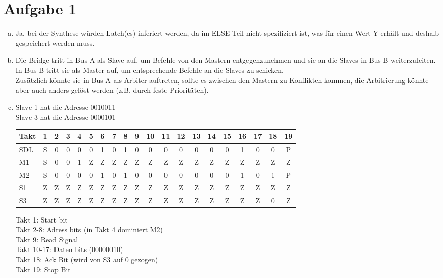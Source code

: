 \documentclass[a4paper]{scrartcl}
\begin{document}
	
	\section*{Aufgabe 1}
	
	\begin{enumerate}[(a)]
		\item Ja, bei der Synthese würden Latch(es) inferiert werden, da im ELSE Teil nicht spezifiziert ist, was für einen Wert Y erhält und deshalb gespeichert werden muss.
		
		\item Die Bridge tritt in Bus A als Slave auf, um Befehle von den Mastern entgegenzunehmen und sie an die Slaves in Bus B weiterzuleiten. In Bus B tritt sie als Master auf, um entsprechende Befehle an die Slaves zu schicken.\\
		Zusätzlich könnte sie in Bus A als Arbiter auftreten, sollte es zwischen den Mastern zu Konflikten kommen, die Arbitrierung könnte aber auch anders gelöst werden (z.B. durch feste Prioritäten).
		
		\item Slave 1 hat die Adresse 0010011\\
		Slave 3 hat die Adresse 0000101\\
		
		\begin{tabular}{|l|c|c|c|c|c|c|c|c|c|c|c|c|c|c|c|c|c|c|c}
			\hline 
			Takt & 1 & 2 & 3 & 4 & 5 & 6  & 7 & 8 & 9 & 10 & 11 & 12 & 13 & 14 & 15 & 16 & 17 & 18 & 19\\ 
			\hline 
			SDL & S & 0 & 0 & 0 & 0 & 1  & 0 & 1 & 0 & 0 & 0 & 0 & 0 & 0 & 0 & 1 & 0 & 0 & P \\ 
			\hline 
			M1 & S & 0 & 0 & 1 & Z & Z  & Z & Z & Z & Z & Z & Z & Z & Z & Z & Z & Z & Z & Z\\ 
			\hline 
			M2 & S & 0 & 0 & 0 & 0 & 1  & 0 & 1 & 0 & 0 & 0 & 0 & 0 & 0 & 0 & 1 & 0 & 1 & P\\ 
			\hline 
			S1& Z & Z & Z & Z & Z & Z & Z & Z & Z & Z & Z & Z & Z & Z & Z & Z & Z & Z & Z\\ 
			\hline 
			S3& Z & Z & Z & Z & Z & Z & Z & Z & Z & Z & Z & Z & Z & Z & Z & Z & Z & 0  & Z \\ 
			\hline 
		\end{tabular} 
		
		Takt 1: Start bit\\
		Takt 2-8: Adress bits (in Takt 4 dominiert M2)\\
		Takt 9: Read Signal\\
		Takt 10-17: Daten bits (00000010)\\
		Takt 18: Ack Bit (wird von S3 auf 0 gezogen)\\
		Takt 19: Stop Bit
		

\end{enumerate}
\end{document}
